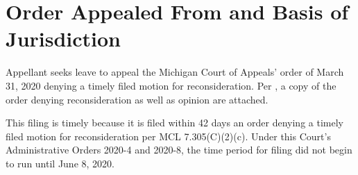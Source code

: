 \documentclass[12pt,\documentclassflag]{michiganCourtOfAppealsBrief}
\begin{document}





\section{Order Appealed From and Basis of Jurisdiction}

Appellant seeks leave to appeal the Michigan Court of Appeals' order of March 31, 2020
denying a timely filed motion for reconsideration.
Per \cite{MCR 7.305(A)(2)}, a copy of the order denying reconsideration as well as opinion are attached.

This filing is timely because it is filed within 42 days an order denying a timely filed motion for reconsideration per MCL 7.305(C)(2)(c). Under this Court's Administrative Orders 2020-4 and 2020-8, the time period for filing did not begin to run until June 8, 2020.
\end{document}
